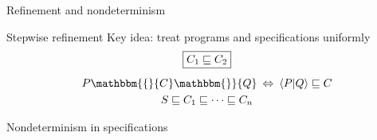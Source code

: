 \documentclass[aspectratio=54]{beamer}
\newcommand{\htr}[3]{{ {#1} \mathbbm{\{} {#2} \mathbbm{\}} {#3} }}
\begin{document}
\begin{frame}{Refinement and nondeterminism} %
  \begin{block}{Stepwise refinement}
  Key idea: treat programs and specifications uniformly
  \begin{gather*}
    \fbox{$C_1 \sqsubseteq C_2$} \\[1ex]
    \htr{P}{C}{Q} \: \Leftrightarrow \:
      \langle P | Q \rangle \sqsubseteq C \\
    S \sqsubseteq C_1 \sqsubseteq \cdots \sqsubseteq C_n
  \end{gather*}
  \end{block}
  \pause
  \begin{block}{Nondeterminism in specifications}
\end{block}
\end{frame}
\end{document}

